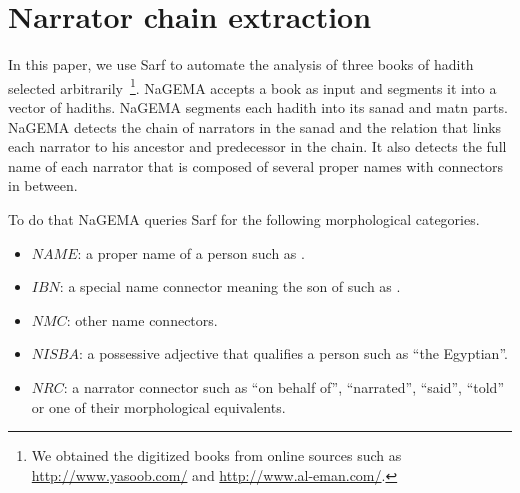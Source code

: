 \documentclass[11pt]{article}
\begin{document}
\section{Narrator chain extraction }
\label{sec:islamic}

In this paper, we use Sarf to automate the
analysis of three books of hadith selected 
arbitrarily~\cite{IbnHanbal,AlKulayni,AlTousi}\footnote{We obtained
  the digitized books from online sources such as 
  \href{http://www.yasoob.com/}{http://www.yasoob.com/} and 
  \href{http://www.al-eman.com/}{http://www.al-eman.com/}. }.
NaGEMA accepts a book as input
and segments it into a vector of hadiths. 
NaGEMA segments each hadith into its
sanad and matn parts. 
NaGEMA 
detects the chain of narrators in the sanad and 
the relation that links each narrator to his ancestor and 
predecessor in the chain. 
It also detects the full name of each narrator that is
composed of several proper names with connectors
in between. 

To do that NaGEMA queries Sarf for the following morphological 
categories.
\begin{itemize}
\item $\mathit{NAME}$: a proper name of a person such as  .
\item $\mathit{IBN}$: a special name connector meaning the son of such as .
\item $\mathit{NMC}$: other name connectors. 
\item $\mathit{NISBA}$: a possessive adjective that qualifies a person such 
as  ``the Egyptian''. 
\item $\mathit{NRC}$: a narrator connector such as
 ``on behalf of'',  ``narrated'',  ``said'', 
 ``told'' or one of their morphological equivalents. 
\end{itemize}

\begin{figure}
\end{figure}
\end{document}
